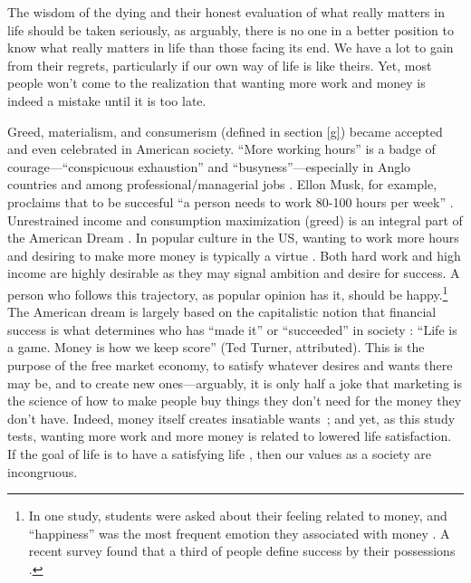 \documentclass[10pt, letterpaper]{article}
\begin{document}
\begin{spacing}{1.8}
The wisdom of the dying and their honest %
evaluation of what really matters in life should be taken seriously, as arguably, there is no one in a better position%
 to know what really matters in life than those facing its end. We have a lot to gain from their regrets, particularly if our own way of life is like theirs. Yet, most people won't come to the realization that wanting more work and money is indeed a mistake until it is too late.

Greed, materialism, and consumerism (defined in section \ref{g}) became accepted and even celebrated in
American society.  ``More working hours'' is a badge of courage---``conspicuous exhaustion'' and
``busyness''---especially in Anglo countries and among professional/managerial jobs
\citep{gershuny05}. 
%
Ellon Musk, for example, proclaims that to be succesful ``a person needs to work 80-100 hours
per week''  \citep{muskIN18nov26}%
.  Unrestrained income and  consumption maximization (greed) is an integral part of the American
Dream \citep{robinson2009greed}.
%
In popular culture %
in the US, wanting to work more hours
and desiring to make more money is typically a virtue {\citep[with some exceptions, e.g.,][]{folbre2000love}.} 
Both hard work and high income are highly desirable as they may signal ambition and desire for success. A person who follows this trajectory, as popular opinion has it, should be happy.\footnote{In one study, students were asked about their feeling related to money, and ``happiness'' was the most frequent emotion they associated with money \citep{mogilner2010pursuit}.
A recent survey found that a third of people define success by their possessions \citep[cited in][]{joye20}.}
%
The American dream is largely based on the capitalistic notion that financial success is what determines who has ``made it'' or ``succeeded'' in society %
\citep{aokditella}: ``Life is a game. Money is how we keep score''  (Ted Turner, attributed).  This is the purpose of the free market economy, to satisfy whatever desires and wants there may be, and to create new ones---arguably, it is only half a joke that marketing is the science of how to make people buy things they don't need for the money they don't have. 
Indeed, money itself creates insatiable wants~\citep{marx1844-human-requirements};
and yet, as this study tests, wanting more work and more money is related to
lowered life satisfaction. If the goal of life is to have a satisfying life%
, then our values as a society are incongruous.


\end{spacing}
\end{document}
